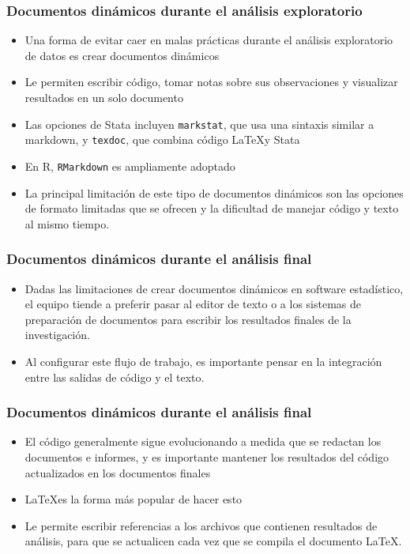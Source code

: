 \documentclass[10pt, aspectratio=169, compress]{beamer}
\begin{document}
\begin{frame}[t]
	\frametitle{Documentos dinámicos durante el análisis exploratorio}
	\begin{itemize}
		\item Una forma de evitar caer en malas prácticas durante el análisis exploratorio de datos es crear documentos dinámicos
		\item Le permiten escribir código, tomar notas sobre sus observaciones y visualizar resultados en un solo documento
		\item Las opciones de Stata incluyen \texttt{markstat}, que usa una sintaxis similar a markdown, y \texttt{texdoc}, que combina código \LaTeX y Stata
		\item En R, \texttt{RMarkdown} es ampliamente adoptado
		\item La principal limitación de este tipo de documentos dinámicos son las opciones de formato limitadas que se ofrecen y la dificultad de manejar código y texto al mismo tiempo.
	\end{itemize}
\end{frame}
\begin{frame}[t]
	\frametitle{Documentos dinámicos durante el análisis final}
	\begin{itemize}
		\item Dadas las limitaciones de crear documentos dinámicos en software estadístico, el equipo tiende a preferir pasar al editor de texto o a los sistemas de preparación de documentos para escribir los resultados finales de la investigación.
		\item Al configurar este flujo de trabajo, es importante pensar en la integración entre las salidas de código y el texto.
	\end{itemize}
\end{frame}
\begin{frame}[t]
	\frametitle{Documentos dinámicos durante el análisis final}
	\begin{itemize}
		\item El código generalmente sigue evolucionando a medida que se redactan los documentos e informes, y es importante mantener los resultados del código actualizados en los documentos finales
		\item \LaTeX es la forma más popular de hacer esto
		\item Le permite escribir referencias a los archivos que contienen resultados de análisis, para que se actualicen cada vez que se compila el documento \LaTeX.
	\end{itemize}
\end{frame}	
\end{document}
